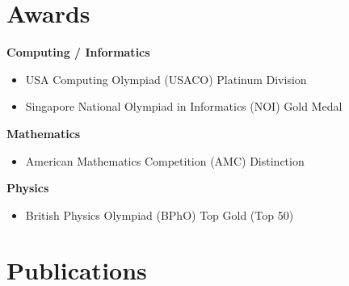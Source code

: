 \documentclass[11pt, letterpaper]{article}
\newenvironment{highlights}{
    \begin{itemize}[
        topsep=0.10 cm,
        parsep=0.10 cm,
        partopsep=0pt,
        itemsep=0pt,
        leftmargin=0.4 cm + 10pt
    ]
}{
    \end{itemize}
} %
\begin{document}
    \section{Awards}


    \textbf{Computing / Informatics}

    \begin{highlights}

        \item USA Computing Olympiad (USACO) \hfill Platinum Division
        
        \item Singapore National Olympiad in Informatics (NOI) \hfill Gold Medal
    \end{highlights}

    \textbf{Mathematics}
    
    \begin{highlights}
        \item American Mathematics Competition (AMC) \hfill Distinction





    \end{highlights}
    
    \textbf{Physics}

    \begin{highlights}
        \item British Physics Olympiad (BPhO) \hfill Top Gold (Top 50)
    \end{highlights}


    \section{Publications}
        
\end{document}
